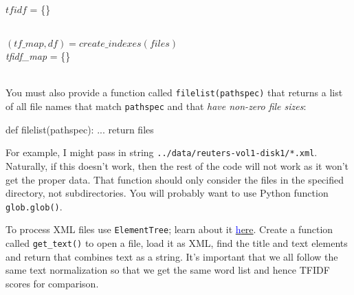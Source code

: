 \begin{fullwidth}
\begin{function}
\vspace{-4pt}
\Indp
	$tfidf$ = \{\}\\
	 \\
\end{function}

\begin{function}
\vspace{-4pt}
\Indp
	$(tf\_map, df) = create\_indexes(files)$\\
	{\em tfidf\_map} = \{\}\\
	 \\
\end{function}

You must also provide a function called {\tt filelist(pathspec)} that returns a list of all file names that match {\tt pathspec} and that {\em  have non-zero file sizes}:

\begin{pyverbatim}
def filelist(pathspec):
    ...
    return files
\end{pyverbatim}
	
For example, I might pass in string {\tt\small ../data/reuters-vol1-disk1/*.xml}. Naturally, if this doesn't work, then the rest of the code will not work as it won't get the proper data.  That function should only consider the files in the specified directory, not subdirectories.  You will probably want to use Python function {\tt glob.glob()}.

To process XML files use {\tt ElementTree}; learn about it \href{http://eli.thegreenplace.net/2012/03/15/processing-xml-in-python-with-elementtree/}{\textcolor{blue}here}.  Create a function called {\tt get\_text()} to open a file, load it as XML, find the title and text elements and return that combines text as a string. It's important that we all follow the same text normalization so that we get the same word list and hence TFIDF scores for comparison.


\end{fullwidth}
